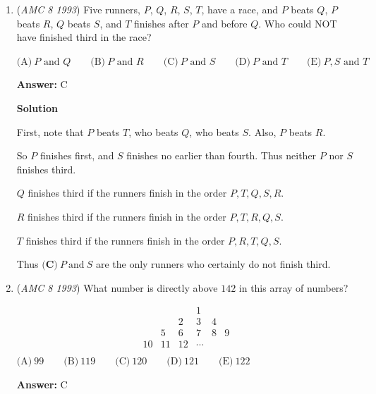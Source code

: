 \begin{enumerate}
 Now, Pat Peano only has $22-1-19=2$ remaining twos. You must subtract 1 because 22 is counted twice. The last numbers with a two that he can write are $102$ and $112$. He can continue numbering the last couple pages without a two until $120$, with the last number he writes being $\boxed{\text{(D)}\ 119}$.

 


	\item (\textit{AMC 8 1993}) Five runners, $P$, $Q$, $R$, $S$, $T$, have a race, and $P$ beats $Q$, $P$ beats $R$, $Q$ beats $S$, and $T$ finishes after $P$ and before $Q$.  Who could NOT have finished third in the race?


 $\text{(A)}\ P\text{ and }Q \qquad \text{(B)}\ P\text{ and }R \qquad \text{(C)}\ P\text{ and }S \qquad \text{(D)}\ P\text{ and }T \qquad \text{(E)}\ P,S\text{ and }T$

 \textbf{Answer: }C



\textbf{Solution}

First, note that $P$ beats $T$, who beats $Q$, who beats $S$. Also, $P$ beats $R$.

 So $P$ finishes first, and $S$ finishes no earlier than fourth.  Thus neither $P$ nor $S$ finishes third.

 $Q$ finishes third if the runners finish in the order $P, T, Q, S, R$.

 $R$ finishes third if the runners finish in the order $P, T, R, Q, S$.

 $T$ finishes third if the runners finish in the order $P, R, T, Q, S$.

 Thus $\boxed{\textbf{(C)}\ P\  \text{and}\ S}$ are the only runners who certainly do not finish third.

 


	\item (\textit{AMC 8 1993}) What number is directly above $142$ in this array of numbers?


 
 \[\begin{array}{cccccc}  & & & 1 & & \\ & & 2 & 3 & 4 & \\ & 5 & 6 & 7 & 8 & 9 \\ 10 & 11 & 12 & \cdots & & \\ \end{array}\]
$\text{(A)}\ 99 \qquad \text{(B)}\ 119 \qquad \text{(C)}\ 120 \qquad \text{(D)}\ 121 \qquad \text{(E)}\ 122$

 \textbf{Answer: }C




\end{enumerate}
